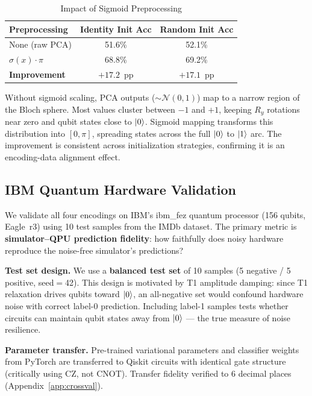\documentclass[conference,onecolumn,11pt]{IEEEtran}
\begin{document}
\begin{table}[t]
\centering
\caption{Impact of Sigmoid Preprocessing}
\label{tab:sigmoid}
\begin{tabular}{lcc}
\toprule
Preprocessing & Identity Init Acc & Random Init Acc \\
\midrule
None (raw PCA) & 51.6\% & 52.1\% \\
$\sigma(x) \cdot \pi$ & 68.8\% & 69.2\% \\
\midrule
\textbf{Improvement} & $\mathbf{+17.2}$~pp & $\mathbf{+17.1}$~pp \\
\bottomrule
\end{tabular}
\end{table}

Without sigmoid scaling, PCA outputs ($\sim \mathcal{N}(0,1)$) map to a narrow region of the Bloch sphere. Most values cluster between $-1$ and $+1$, keeping $R_y$ rotations near zero and qubit states close to $\ket{0}$. Sigmoid mapping transforms this distribution into $[0, \pi]$, spreading states across the full $\ket{0}$ to $\ket{1}$ arc. The improvement is consistent across initialization strategies, confirming it is an encoding-data alignment effect.

\subsection{IBM Quantum Hardware Validation}

We validate all four encodings on IBM's ibm\_fez quantum processor (156 qubits, Eagle~r3) using 10 test samples from the IMDb dataset. The primary metric is \textbf{simulator--QPU prediction fidelity}: how faithfully does noisy hardware reproduce the noise-free simulator's predictions?

\textbf{Test set design.} We use a \textbf{balanced test set} of 10 samples (5 negative / 5 positive, seed$=$42). This design is motivated by T1 amplitude damping: since T1 relaxation drives qubits toward $\ket{0}$, an all-negative set would confound hardware noise with correct label-0 prediction. Including label-1 samples tests whether circuits can maintain qubit states away from $\ket{0}$ --- the true measure of noise resilience.

\textbf{Parameter transfer.} Pre-trained variational parameters and classifier weights from PyTorch are transferred to Qiskit circuits with identical gate structure (critically using CZ, not CNOT). Transfer fidelity verified to 6 decimal places (Appendix~\ref{app:crossval}).
\end{document}
